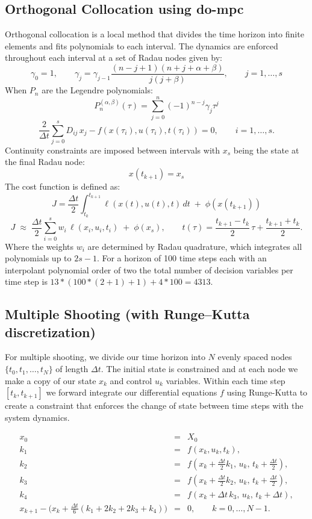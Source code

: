 \documentclass[]{article}
\begin{document}
\subsection*{Orthogonal Collocation using {do-mpc}} 
Orthogonal collocation is a local method that divides the time horizon into finite elements and fits polynomials to each interval. The dynamics are enforced throughout each interval at a set of Radau nodes given by:
        \[
        \gamma_0=1,  \qquad \gamma_j = \gamma_{j-1} \frac{(n-j+1)(n+j+\alpha+\beta)}{j(j+\beta)}, \qquad j = 1,\ldots,s
        \]
When $P_n$ are the Legendre polynomials:
        \[
        P_n^{(\alpha, \beta)}(\tau) = \sum_{j=0}^{n}(-1)^{n-j}\gamma_j\tau^j
        \]
        \[
        \frac{2}{\Delta t}\sum_{j=0}^s D_{ij}\,x_j - f(x(\tau_i),u(\tau_i),t(\tau_i))=0, 
        \qquad i=1,\dots,s.
        \]
Continuity constraints are imposed between intervals with $x_s$ being the state at the final Radau node:
        \[
       x(t_{k+1})=x_s 
        \]
The cost function is defined as:
        \[
        	J=\frac{\Delta t}{2}\int_{t_k}^{t_{k+1}} \ell(x(t),u(t),t)\,dt \;+\; \phi(x(t_{k+1}))
        \]
        \[
        J \;\approx\; \frac{\Delta t}{2} \sum_{i=0}^{s} w_i \,\ell(x_i,u_i,t_i)
        \;+\; \phi(x_s),
        \qquad  t(\tau) = \frac{t_{k+1}-t_k}{2}\,\tau + \frac{t_{k+1}+t_k}{2}.
        \]
Where the weights $w_i$ are determined by Radau quadrature, which integrates all polynomials up to $2s-1$. For a horizon of 100 time steps each with an interpolant polynomial order of two the total number of decision variables per time step is $13*(100*(2+1)+1)+4*100=4313.$

\subsection*{Multiple Shooting (with Runge–Kutta discretization)}
For multiple shooting, we divide our time horizon into $N$ evenly spaced nodes $\{ t_0, t_1, \ldots, t_N \}$ of length $\Delta t$. The initial state is constrained and at each node we make a copy of our state $x_k$ and control $u_k$ variables. Within each time step $[ t_k, t_{k+1}]$ we forward integrate our differential equations $f$ using Runge-Kutta to create a constraint that enforces the change of state between time steps with the system dynamics. 

        \begin{eqnarray}
        \nonumber
        x_0 & = & X_0 \\[6pt] \nonumber
        k_1 & = & f(x_k, u_k, t_k), \\[6pt] \nonumber
        k_2 & = & f\!\left(x_k + \tfrac{\Delta t}{2} k_1,\, u_k,\, t_k + \tfrac{\Delta t}{2}\right), \\[6pt] \nonumber
        k_3 & = & f\!\left(x_k + \tfrac{\Delta t}{2} k_2,\, u_k,\, t_k + \tfrac{\Delta t}{2}\right), \\[6pt] \nonumber
        k_4 & = & f\!\left(x_k + \Delta t\, k_3,\, u_k,\, t_k + \Delta t\right), \\[10pt]
        x_{k+1} - \Big(x_k + \tfrac{\Delta t}{6}(k_1 + 2k_2 + 2k_3 + k_4)\Big) &=& 0, 
        \qquad k = 0,\dots, N-1.
        \label{eq:rkstate}
        \end{eqnarray}
        
\end{document}
